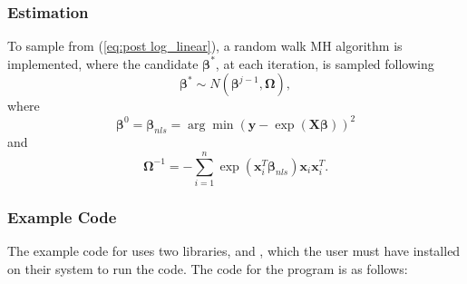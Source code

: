 \documentclass[article]{jss}
\begin{document}
\subsubsection{Estimation}

To sample from (\ref{eq:post log_linear}), a random walk MH algorithm
is implemented, where the candidate $\bm{\beta}^{*}$, at each iteration,
is sampled following \begin{equation}
\bm{\beta}^{*}\sim N\left(\bm{\beta}^{j-1},\bm{\Omega}\right),\label{eq:candidate log-linear}\end{equation}
 where\[
\bm{\beta}^{0}=\bm{\beta}_{nls}=\arg\min\left(\bm{y}-\exp\left(\bm{X}\bm{\beta}\right)\right)^{2}\]
 and\[
\bm{\Omega}^{-1}=-\sum_{i=1}^{n}\exp\left(\bm{x}_{i}^{T}\bm{\beta}_{nls}\right)\bm{x}_{i}\bm{x}_{i}^{T}.\]



\subsubsection{Example Code}

The example code for  uses two 
libraries,  and , which the user must have
installed on their system to run the code.  The code for the program
is as follows:
\end{document}
